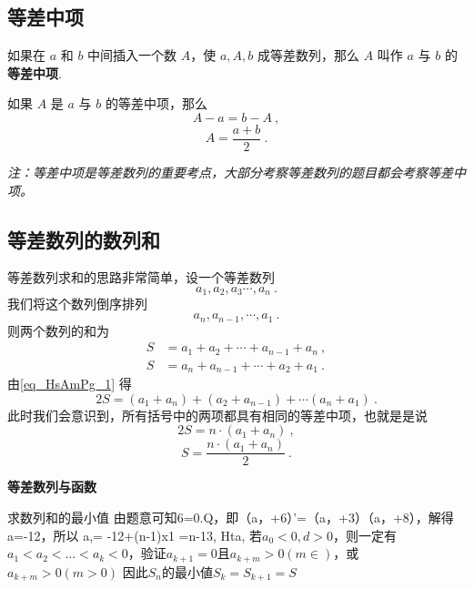 \subsection{等差中项}
如果在 $a$ 和 $b$ 中间插入一个数 $A$，使 $a,A,b$ 成等差数列，那么 $A$ 叫作 $a$ 与 $b$ 的\textbf{等差中项}.

如果 $A$ 是 $a$ 与 $b$ 的等差中项，那么
\begin{equation}
A - a = b - A~,
\end{equation}
\begin{equation}
A = \frac{a+b}{2}~.
\end{equation}

\textsl{注：等差中项是等差数列的重要考点，大部分考察等差数列的题目都会考察等差中项。}

\subsection{等差数列的数列和}

等差数列求和的思路非常简单，设一个等差数列
\begin{equation}
a_1,a_2,a_3\cdots,a_n~.
\end{equation}
我们将这个数列倒序排列
\begin{equation}
a_n,a_{n-1},\cdots,a_1~.
\end{equation}
则两个数列的和为
\begin{equation}\label{eq_HsAmPg_1}
\begin{aligned}
S &= a_1 + a_2 + \cdots + a_{n-1} + a_n ~,\\
S &= a_n + a_{n - 1} + \cdots + a_2 + a_1~.
\end{aligned}
\end{equation}
由\autoref{eq_HsAmPg_1} 得
\begin{equation}
2S = (a_1+a_n) + (a_2+a_{n-1}) +\cdots (a_n + a_1)~.
\end{equation}
此时我们会意识到，所有括号中的两项都具有相同的等差中项，也就是是说
\begin{equation}
2S = n \cdot (a_1+a_n)~,
\end{equation}
\begin{equation}
S = \frac{n\cdot(a_1+a_n)}{2}~.
\end{equation}

\textbf{等差数列与函数}

求数列和的最小值
由题意可知6=0.Q，即（a，+6）’=（a，+3）（a，+8），解得a=-12，所以
a,= -12+(n-1)x1 =n-13, Hta, 
若$a_0<0,d>0$，则一定有$a_1<a_2<\dots<a_{k}<0$，验证$a_{k+1} =0$且$a_{k+m}>0(m\in)$，或$a_{k+m}>0(m>0)$
因此$S_n$的最小値$S_k=S_{k+1}=S$